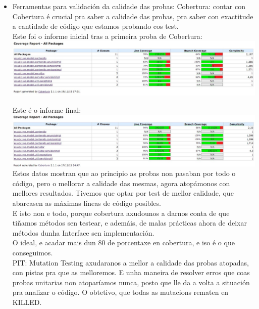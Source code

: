 \documentclass[DIV=calc,paper=a4,fontsize=11pt,onecolumn]{scrartcl}	 %
\begin{document}
\begin{itemize}
	  	
	  	
	\item Ferramentas para validación da calidade das probas:
		\subitem Cobertura: contar con Cobertura é crucial pra saber a calidade das probas, pra saber con exactitude a cantidade de código que estamos probando cos test. \\
		
		Este foi o informe inicial tras a primeira proba de Cobertura:\\
		
		\includegraphics[width=15cm]{Imagenes/cobertura-inicio.jpg}
		
		Este é o informe final:\\
		
		\includegraphics[width=15cm]{Imagenes/cobertura-final.jpg} \\
		
		Estos datos mostran que ao principio as probas non pasaban por todo o código, pero o mellorar a calidade das mesmas, agora atopámonos con mellores resultados. Tivemos que optar por test de mellor calidade, que abarcasen as máximas líneas de código posibles.\\
		
		E isto non e todo, porque cobertura axudounos a darnos conta de que tiñamos métodos sen testear, e ademáis, de malas prácticas ahora de deixar métodos dunha Interface sen implementación. \\
		
		O ideal, e acadar mais dun 80 de porcentaxe en cobertura, e iso é o que conseguimos.\\
		
		\subitem PIT: Mutation Testing axudaranos a mellor a calidade das probas atopadas, con pistas pra que as melloremos. E unha maneira de resolver erros que coas probas unitarias non atoparíamos nunca, posto que lle da a volta a situación pra analizar o código. O obtetivo, que todas as mutacions rematen en KILLED.\\
		

\end{itemize}
\end{document}
